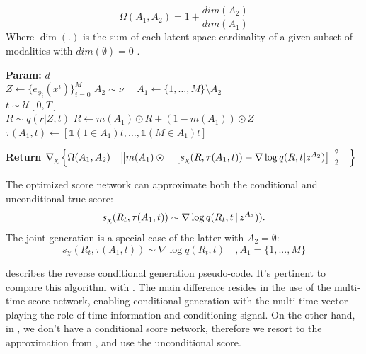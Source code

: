 \begin{equation} \label{eq:weight_eq}
    \Omega(A_1,A_2) = 1 + \frac{dim(A_2)}{dim(A_1)}
\end{equation}
Where $\dim(.) $ is the sum of each latent space cardinality of a given subset of modalities with $dim(\emptyset) = 0 $ .





\begin{algorithm}[hbt!]
\DontPrintSemicolon
\SetAlgoLined
\SetNoFillComment
\LinesNotNumbered 
\caption{\gls{MLD} Masked Multi-time diffusion training step}\label{algo:MLD_training}
\textbf{Param:} $d$ \\
$Z \gets \{ e_{\phi_i}(x^i) \}_{i=0}^M $    
 $A_2 \sim \nu  \quad $ 
$A_1\gets \{1,\dots,M\}\setminus A_2 $ \\
$t \sim \mathcal{U}[0,T]$ \\

$R  \sim  q (r|Z,t) $ 
$R \gets m(A_1) \odot R     + (1- m(A_1) ) \odot Z$   \label{train_line_mask}
$\tau(A_1,t) \gets \left[\mathds{1}(1\in A_1)t,\dots,\mathds{1}(M\in A_1)t\right]$  

\textbf{Return} $ \nabla_{\chi} \left\{  \Omega(A_1,A_2) \quad  \norm{m(A_1)\odot \quad \left [  s_{\chi}(R,\tau(A_1,t))-\nabla \log q(R,t|z^{A_2})  \right]     }^2_2   \quad \right\} $

\end{algorithm}

The optimized score network can approximate both the conditional and unconditional true score:
\begin{equation}
    s_\chi(R_t,\tau(A_1,t)) \sim  \nabla\log q(R_t,t\,|\, z^{A_2})).
\end{equation}
The joint generation is a special case of the latter with $A_2 = \emptyset$:
\begin{equation}
    s_\chi(R_t,\tau(A_1,t)) \sim  \nabla\log q(R_t,t) \quad     ,A_1 = \{1,...,M\}
\end{equation}

 describes the reverse conditional generation pseudo-code. It's pertinent to compare this algorithm with . The main difference resides in the use of the multi-time score network, enabling conditional generation with the multi-time vector playing the role of time information and conditioning signal. On the other hand, in , we don't have a conditional score network, therefore we resort to the approximation from , and use the unconditional score. 


